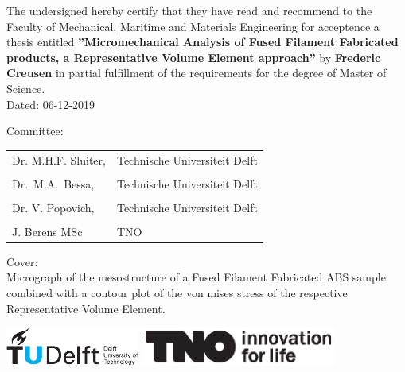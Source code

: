 \begin{titlepage}
\begin{center}
\end{center}

\clearpage
\thispagestyle{empty}

\noindent The undersigned hereby certify that they have read and recommend to the Faculty of Mechanical, Maritime and Materials Engineering for acceptence a thesis entitled \textbf{”Micromechanical Analysis of Fused Filament Fabricated products, a Representative Volume Element approach”} by \textbf{Frederic Creusen} in partial fulfillment of the requirements for the degree of Master of Science.\\
Dated: 06-12-2019

\bigskip
\noindent  Committee:

\medskip\noindent
\begin{tabular}{b{4cm}m{6cm}}
Dr. M.H.F. Sluiter, & Technische Universiteit Delft \\
\\
Dr.\ M.A.\ Bessa, & Technische Universiteit Delft \\
\\
Dr. V. Popovich, & Technische Universiteit Delft \\
\\
J. Berens MSc & TNO \\
\end{tabular}
\vfill
\noindent Cover: \\
\hfill
Micrograph of the mesostructure of a Fused Filament Fabricated ABS sample combined with a contour plot of the von mises stress of the respective Representative Volume Element.

\vfill
\begin{center}
    \includegraphics[height=0.5in]{title/logos/tudelft}
    \hspace{2em}
    \includegraphics[height=0.5in]{title/logos/tno.eps} \\
\end{center}



\end{titlepage}
